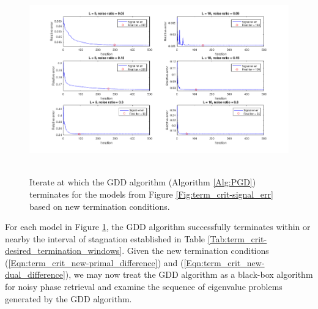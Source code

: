 \begin{figure}[H]
\centering
\hbox{\hspace{-1.9cm} \includegraphics[scale=0.6]{term_crit-model_term_for_tols} }\vspace{-0.4cm}
	\caption{Iterate at which the GDD algorithm (Algorithm \ref{Alg:PGD}) terminates for the models from Figure \ref{Fig:term_crit-signal_err} based on new termination conditions.}
\label{Fig:term_crit-model_term_for_tols}
\end{figure}

For each model in Figure \ref{Fig:term_crit-model_term_for_tols}, the GDD algorithm successfully terminates within or nearby the interval of stagnation established in Table \ref{Tab:term_crit-desired_termination_windows}.
Given the new termination conditions (\ref{Eqn:term_crit_new-primal_difference}) and (\ref{Eqn:term_crit_new-dual_difference}), we may now treat the GDD algorithm as a black-box algorithm for noisy phase retrieval and examine the sequence of eigenvalue problems generated by the GDD algorithm.




